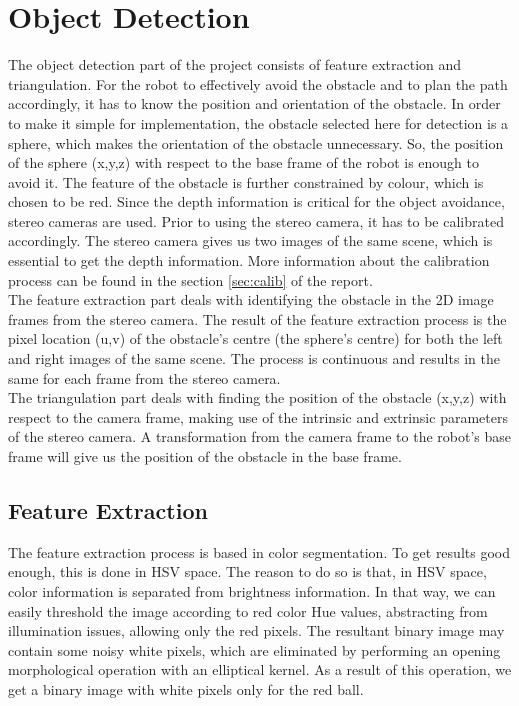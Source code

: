 \section{Object Detection}
\label{sec:det}
The object detection part of the project consists of feature extraction and triangulation. For the robot to effectively avoid the obstacle and to plan the path accordingly, it has to know the position and orientation of the obstacle. In order to make it simple for implementation, the obstacle selected here for detection is a sphere, which makes the orientation of the obstacle unnecessary. So, the position of the sphere (x,y,z) with respect to the base frame of the robot is enough to avoid it. The feature of the obstacle is further constrained by colour, which is chosen to be red. Since the depth information is critical for the object avoidance, stereo cameras are used. Prior to using the stereo camera, it has to be calibrated accordingly. The stereo camera gives us two images of the same scene, which is essential to get the depth information. More information about the calibration process can be found in the section \ref{sec:calib} of the report.\\

The feature extraction part deals with identifying the obstacle in the 2D image frames from the stereo camera. The result of the feature extraction process is the pixel location (u,v) of the obstacle's centre (the sphere's centre) for both the left and right images of the same scene. The process is continuous and results in the same for each frame from the stereo camera.\\

The triangulation part deals with finding the position of the obstacle (x,y,z) with respect to the camera frame, making use of the intrinsic and extrinsic parameters of the stereo camera. A transformation from the camera frame to the robot's base frame will give us the position of the obstacle in the base frame.

\subsection{Feature Extraction}
\label{sec:feat}

The feature extraction process is based in color segmentation. To get results good enough, this is done in HSV space. The reason to do so is that, in HSV space, color information is separated from brightness information. In that way, we can easily threshold the image according to red color Hue values, abstracting from illumination issues, allowing only the red pixels. The resultant binary image may contain some noisy white pixels, which are eliminated by performing an opening morphological operation with an elliptical kernel. As a result of this operation, we get a binary image with white pixels only for the red ball.\\

